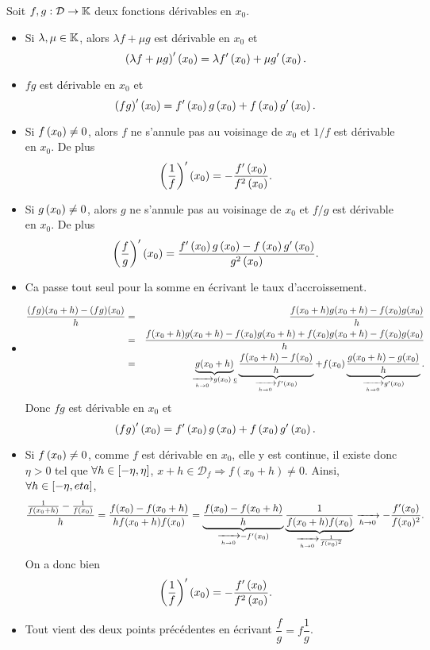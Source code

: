 \documentclass{magnolia}
\begin{document}
\begin{proposition}[utile=-3]
Soit $f,g:\mathcal{D}\to\mathbb{K}$ deux fonctions dérivables en $x_0$.
\begin{itemize}
\item Si $\lambda,\mu\in\mathbb{K}$, alors $\lambda f+\mu g$ est dérivable
  en $x_0$ et
  \[\left(\lambda f+\mu g\right)'\left(x_0\right)=\lambda f'\left(x_0\right)+\mu g'\left(x_0\right).\]
\item $fg$ est dérivable en $x_0$ et
  \[\left(fg\right)'\left(x_0\right)=f'\left(x_0\right)g\left(x_0\right)+f\left(x_0\right)g'\left(x_0\right).\]
\item Si $f\left(x_0\right)\neq 0$, alors $f$ ne s'annule pas au voisinage de $x_0$
  et $1/f$ est dérivable en $x_0$. De plus
  \[\left(\frac{1}{f}\right)'\left(x_0\right)=-\frac{f'\left(x_0\right)}{f^2\left(x_0\right)}.\]
\item Si $g\left(x_0\right)\neq 0$, alors $g$ ne s'annule pas au voisinage de $x_0$
  et $f/g$ est dérivable en $x_0$. De plus
  \[\left(\frac{f}{g}\right)'\left(x_0\right)=\frac{f'\left(x_0\right)g\left(x_0\right)-f\left(x_0\right)g'\left(x_0\right)}{
    g^2\left(x_0\right)}.\]
\end{itemize}
\end{proposition}

\begin{preuve}
\begin{itemize}
\item Ca passe tout seul pour la somme en écrivant le taux d'accroissement.
\item 
\begin{eqnarray*}
\frac{(fg)(x_0+h)-(fg)(x_0)}{h}&=&\frac{f(x_0+h)g(x_0+h)-f(x_0)g(x_0)}{h}\\
&=&\frac{f(x_0+h)g(x_0+h)-f(x_0)g(x_0+h)+f(x_0)g(x_0+h)-f(x_0)g(x_0)}{h}\\
&=&\underbrace{g(x_0+h)}_{\xrightarrow[h\rightarrow 0]{}g(x_0) \text { \underline{c}}}\underbrace{\frac{f(x_0+h)-f(x_0)}{h}}_{\xrightarrow[h\rightarrow 0]{}f'(x_0)}+f(x_0)\underbrace{\frac{g(x_0+h)-g(x_0)}{h}}_{\xrightarrow[h\rightarrow 0]{}g'(x_0)}.
\end{eqnarray*}
Donc $fg$ est dérivable en $x_0$ et
  \[\left(fg\right)'\left(x_0\right)=f'\left(x_0\right)g\left(x_0\right)+f\left(x_0\right)g'\left(x_0\right).\]
  \item Si $f\left(x_0\right)\neq 0$, comme $f$ est dérivable en $x_0$, elle y est continue, il existe donc $\eta>0$ tel que $\forall h\in \left[-\eta,\eta\right]$, $x+h\in \mathcal{D}_f \Longrightarrow f(x_0+h)\neq 0$. Ainsi, $\forall h \in \left[-\eta,eta\right]$, $$\frac{\frac{1}{f(x_0+h)}-\frac{1}{f(x_0)}}{h}=\frac{f(x_0)-f(x_0+h)}{hf(x_0+h)f(x_0)}=\underbrace{\frac{f(x_0)-f(x_0+h)}{h}}_{\xrightarrow[h\rightarrow 0]{}-f'(x_0)}\underbrace{\frac{1}{f(x_0+h)f(x_0)}}_{\xrightarrow[h\rightarrow 0]{}\frac{1}{f(x_0)^2}}\xrightarrow[h\rightarrow 0]{}-\frac{f'(x_0)}{f(x_0)^2}.$$
  On a donc bien
    \[\left(\frac{1}{f}\right)'\left(x_0\right)=-\frac{f'\left(x_0\right)}{f^2\left(x_0\right)}.\]
\item Tout vient des deux points précédentes en écrivant $\dfrac{f}{g}=f\dfrac{1}{g}$.
\end{itemize}

\end{preuve}
\end{document}
